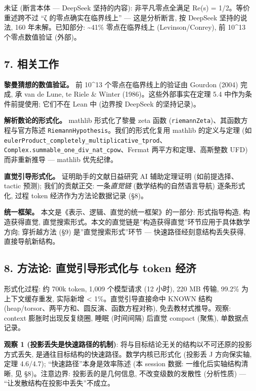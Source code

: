 \documentclass[
]{article}
\begin{document}
未证 (断言本体 --- DeepSeek 坚持的内容): 非平凡零点全满足 Re(s) =
1/2。等价重述跨不过 ``ζ 的零点确实在临界线上'' --- 这是分析断言, 按
DeepSeek 坚持的说法, 160 年未解。已知部分: \textasciitilde41\%
零点在临界线上 (Levinson/Conrey), 前 10\^{}13 个零点数值验证 (外部)。

\subsection{7. 相关工作}\label{ux76f8ux5173ux5de5ux4f5c}

\textbf{黎曼猜想的数值验证。} 前 10\^{}13 个零点在临界线上的验证由
Gourdon (2004) 完成, 承 van de Lune, te Riele \& Winter
(1986)。这些外部事实在定理 5.4 中作为条件前提使用; 它们不在 Lean 中
(边界按 DeepSeek 的坚持记录)。

\textbf{解析数论的形式化。} mathlib 形式化了黎曼 zeta 函数
(\texttt{riemannZeta})、其函数方程与官方陈述
\texttt{RiemannHypothesis}。我们的形式化复用 mathlib 的定义与定理 (如
\texttt{eulerProduct\_completely\_multiplicative\_tprod}、\texttt{Complex.summable\_one\_div\_nat\_cpow}、Fermat
两平方和定理、高斯整数 UFD) 而非重新推导 --- mathlib 优先纪律。

\textbf{直觉引导形式化。} 证明助手的文献日益研究 AI 辅助定理证明
(如前提选择、tactic 预测); 我们的贡献正交: 一条\emph{直觉链}
(数学结构的自然语言导航) 逐条形式化, 过程 token 经济作为方法论数据记录
(§8)。

\textbf{统一框架。} 本文是《表示、逻辑、直觉的统一框架》的一部分:
形式指导构造, 构造获得直觉,
直觉搜索形式。本文的直觉链是''构造获得直觉''环节应用于具体数学方向;
穿折越方法 (§9) 是''直觉搜索形式''环节 --- 快速路径经刻意结构丢失获得,
直接导航新结构。

\subsection{8. 方法论: 直觉引导形式化与 token
经济}\label{ux65b9ux6cd5ux8bba-ux76f4ux89c9ux5f15ux5bfcux5f62ux5f0fux5316ux4e0e-token-ux7ecfux6d4e}

形式化过程: 约 700k token, 1,009 个模型请求 (12 小时), 220 MB 传输,
99.2\% 为上下文缓存重发, 实际新增 \textless{} 1\%。直觉引导直接命中
KNOWN 结构 (heap/torsor、两平方和、圆反演、函数方程对称),
免去教材式推导。观察: context 膨胀时出现反复绕圈, 睡眠 (时间间隔) 后直觉
compact (聚焦), 单数据点记录。

\textbf{观察 1 (投影丢失是快速路径的机制)}:
将与目标结论无关的结构以不可还原的投影方式丢失,
是通往目标结构的快速路径。数学内核已形式化 (投影丢 J 方向保实轴, 定理
4.6/4.7); ``快速路径''本身是效率陈述 (本 session 数据:
一维化后实轴结构清晰, 见 §8)。注意边界: 投影丢的是几何信息,
不改变级数的发散性 (分析性质) --- ``让发散结构在投影中丢失''不成立。
\end{document}
